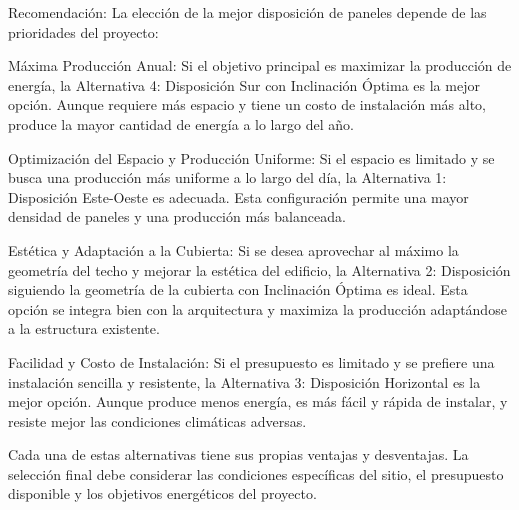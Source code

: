 \documentclass{article}
\begin{document}
Recomendación: La elección de la mejor disposición de paneles depende de las prioridades del proyecto:

Máxima Producción Anual: Si el objetivo principal es maximizar la producción de energía, la Alternativa 4: Disposición Sur con Inclinación Óptima es la mejor opción. Aunque requiere más espacio y tiene un costo de instalación más alto, produce la mayor cantidad de energía a lo largo del año.

Optimización del Espacio y Producción Uniforme: Si el espacio es limitado y se busca una producción más uniforme a lo largo del día, la Alternativa 1: Disposición Este-Oeste es adecuada. Esta configuración permite una mayor densidad de paneles y una producción más balanceada.

Estética y Adaptación a la Cubierta: Si se desea aprovechar al máximo la geometría del techo y mejorar la estética del edificio, la Alternativa 2: Disposición siguiendo la geometría de la cubierta con Inclinación Óptima es ideal. Esta opción se integra bien con la arquitectura y maximiza la producción adaptándose a la estructura existente.

Facilidad y Costo de Instalación: Si el presupuesto es limitado y se prefiere una instalación sencilla y resistente, la Alternativa 3: Disposición Horizontal es la mejor opción. Aunque produce menos energía, es más fácil y rápida de instalar, y resiste mejor las condiciones climáticas adversas.

Cada una de estas alternativas tiene sus propias ventajas y desventajas. La selección final debe considerar las condiciones específicas del sitio, el presupuesto disponible y los objetivos energéticos del proyecto.



\end{document}
